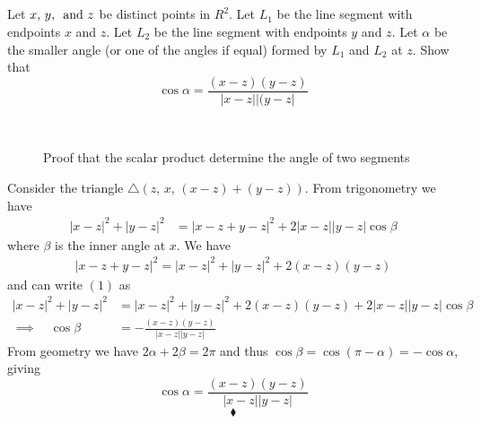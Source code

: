 \subsection{}
\begin{tcolorbox}
Let $x,\, y,\, \text{ and } z$ be distinct points in $R^2$. Let $L_1$ be the line segment with endpoints $x$ and $z$. Let $L_2$ be the line segment with endpoints $y$ and $z$. Let $\alpha$ be the smaller angle (or one of the angles if equal) formed by $L_1$ and $L_2$ at $z$. Show that $$\cos\alpha = \frac{(x-z)(y-z)}{|x-z| |(y-z|}$$
\end{tcolorbox}
\begin{figure}[H]%
    \centering
\\
\caption{Proof that the scalar product determine the angle of two segments }
\label{fig:fig_p8a}
\end{figure}
Consider the triangle $\triangle \left(z,\,x,\, (x-z)+ (y-z)\right)$. From trigonometry we have 
\begin{align}
|x-z|^2+|y-z|^2&= |x-z+ y-z|^2+2|x-z||y-z|\cos \beta
\end{align}
where $\beta$ is the inner angle at $x$.
We have 
\begin{align*}
|x-z+ y-z|^2= |x-z|^2+|y-z|^2+2(x-z)(y-z)
\end{align*}
and can write $(1)$ as 
\begin{align*}
|x-z|^2+|y-z|^2&= |x-z|^2+|y-z|^2+2(x-z)(y-z)+2|x-z||y-z|\cos \beta\\
\implies\quad \cos\beta&= -\frac{(x-z)(y-z)}{|x-z||y-z|}
\end{align*}
From geometry we have $2\alpha+2\beta = 2\pi$ and thus $\cos\beta = \cos (\pi-\alpha)= -\cos\alpha$, giving 
$$\cos \alpha= \frac{(x-z)(y-z)}{|x-z||y-z|}$$
$$\blacklozenge$$\\

